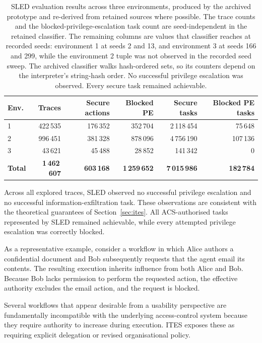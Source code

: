\documentclass{article}
\begin{document}
\begin{table}[t]
\centering
\small
\begin{tabular}{lrrrrr}
\toprule
\textbf{Env.} & \textbf{Traces} & \textbf{Secure actions} & \textbf{Blocked PE} & \textbf{Secure tasks} & \textbf{Blocked PE tasks} \\
\midrule
1 & 422\,535 & 176\,352 & 352\,704 & 2\,118\,454 & 75\,648 \\
2 & 996\,451 & 381\,328 & 878\,096 & 4\,756\,190 & 107\,136 \\
3 & 43\,621 & 45\,488 & 28\,852 & 141\,342 & 0 \\
\midrule
\textbf{Total} & \textbf{1\,462\,607} & \textbf{603\,168} & \textbf{1\,259\,652} & \textbf{7\,015\,986} & \textbf{182\,784} \\
\bottomrule
\end{tabular}
\caption{SLED evaluation results across three environments, produced by the
archived prototype and re-derived from retained sources where possible. The
trace counts and the blocked-privilege-escalation task count are seed-independent
in the retained classifier. The remaining columns are values that classifier
reaches at recorded seeds: environment 1 at seeds 2 and 13, and environment 3 at
seeds 166 and 299, while the environment 2 tuple was not observed in the recorded
seed sweep. The archived classifier walks hash-ordered sets, so its counters
depend on the interpreter's string-hash order. No successful privilege
escalation was observed. Every secure task remained achievable.}
\label{tab:results}
\end{table}

Across all explored traces, SLED observed no successful privilege escalation
and no successful information-exfiltration task. These observations are
consistent with the theoretical guarantees of Section~\ref{sec:ites}. All
ACS-authorised tasks represented by SLED remained achievable, while every
attempted privilege escalation was correctly blocked.

As a representative example, consider a workflow in which Alice authors a
confidential document and Bob subsequently requests that the agent email its
contents. The resulting execution inherits influence from both Alice and Bob.
Because Bob lacks permission to perform the requested action, the effective
authority excludes the email action, and the request is blocked.

Several workflows that appear desirable
from a usability perspective are fundamentally incompatible with the underlying
access-control system because they require authority to increase during
execution. ITES exposes these as requiring explicit delegation or revised
organisational policy.
\end{document}
